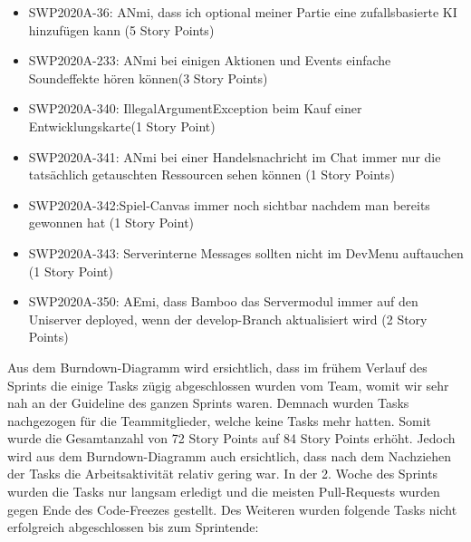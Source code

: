 \documentclass[12pt,a4paper, oneside]{article}
\begin{document}
    \begin{itemize}

        \item SWP2020A-36: ANmi, dass ich optional meiner Partie eine zufallsbasierte KI hinzufügen kann (5 Story Points)
        \item SWP2020A-233: ANmi bei einigen Aktionen und Events einfache Soundeffekte hören können(3 Story Points)

        \item SWP2020A-340: IllegalArgumentException beim Kauf einer Entwicklungskarte(1 Story Point)

        \item SWP2020A-341: ANmi bei einer Handelsnachricht im Chat immer nur die tatsächlich getauschten Ressourcen sehen können (1 Story Points)

        \item SWP2020A-342:Spiel-Canvas immer noch sichtbar nachdem man bereits gewonnen hat (1 Story Point)

        \item SWP2020A-343: Serverinterne Messages sollten nicht im DevMenu auftauchen (1 Story Point)

        \item SWP2020A-350: AEmi, dass Bamboo das Servermodul immer auf den Uniserver deployed, wenn der develop-Branch aktualisiert wird (2 Story Points)

    \end{itemize}

    \newpage
    \noindent
    Aus dem Burndown-Diagramm wird ersichtlich, dass im frühem Verlauf des Sprints die einige Tasks zügig abgeschlossen wurden vom Team, womit wir sehr nah an der Guideline des ganzen Sprints waren. Demnach wurden Tasks nachgezogen für die Teammitglieder, welche keine Tasks mehr hatten.
    Somit wurde die Gesamtanzahl von 72 Story Points auf 84 Story Points erhöht.
    Jedoch wird aus dem Burndown-Diagramm auch ersichtlich, dass nach dem Nachziehen der Tasks die Arbeitsaktivität relativ gering war. In der 2. Woche des Sprints wurden die Tasks nur langsam erledigt und die meisten Pull-Requests wurden gegen Ende des Code-Freezes gestellt. Des Weiteren wurden folgende Tasks nicht erfolgreich abgeschlossen bis zum Sprintende:
\end{document}
